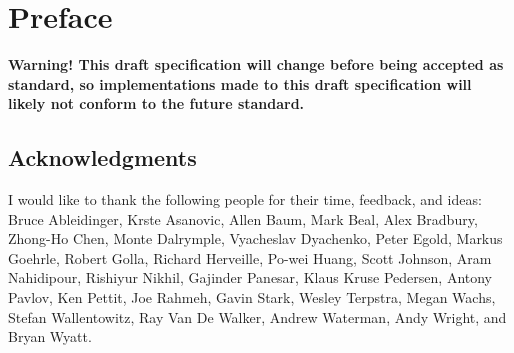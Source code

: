 \chapter{Preface}

{\bf Warning! This draft specification will change before being accepted as
standard, so implementations made to this draft specification will likely not
conform to the future standard.}


\section*{Acknowledgments}

I would like to thank the following people for their time, feedback, and ideas:
Bruce Ableidinger,
Krste Asanovic,
Allen Baum,
Mark Beal,
Alex Bradbury,
Zhong-Ho Chen,
Monte Dalrymple,
Vyacheslav Dyachenko,
Peter Egold,
Markus Goehrle,
Robert Golla,
Richard Herveille,
Po-wei Huang,
Scott Johnson,
Aram Nahidipour,
Rishiyur Nikhil,
Gajinder Panesar,
Klaus Kruse Pedersen,
Antony Pavlov,
Ken Pettit,
Joe Rahmeh,
Gavin Stark,
Wesley Terpstra,
Megan Wachs,
Stefan Wallentowitz,
Ray Van De Walker,
Andrew Waterman,
Andy Wright,
and Bryan Wyatt.
